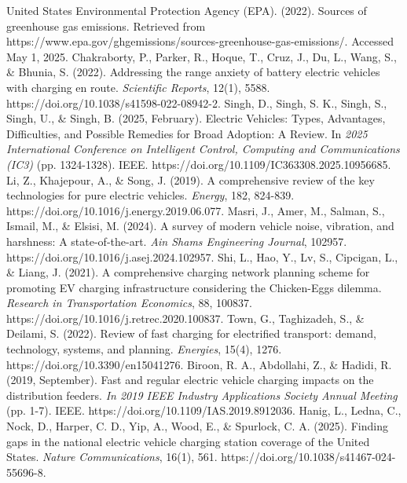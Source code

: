 \documentclass[preprint,12pt]{elsarticle}
\begin{document}
\cleardoublepage

\begin{thebibliography}{00}

United States Environmental Protection Agency (EPA). (2022).
Sources of greenhouse gas emissions.
Retrieved from https://www.epa.gov/ghgemissions/sources-greenhouse-gas-emissions/. Accessed May 1, 2025.
Chakraborty, P., Parker, R., Hoque, T., Cruz, J., Du, L., Wang, S., \& Bhunia, S. (2022). Addressing the range anxiety of battery electric vehicles with charging en route. \textit{Scientific Reports}, 12(1), 5588. https://doi.org/10.1038/s41598-022-08942-2.
Singh, D., Singh, S. K., Singh, S., Singh, U., \& Singh, B. (2025, February). Electric Vehicles: Types, Advantages, Difficulties, and Possible Remedies for Broad Adoption: A Review. In \textit{2025 International Conference on Intelligent Control, Computing and Communications (IC3)} (pp. 1324-1328). IEEE. https://doi.org/10.1109/IC363308.2025.10956685.
Li, Z., Khajepour, A., \& Song, J. (2019). A comprehensive review of the key technologies for pure electric vehicles. \textit{Energy}, 182, 824-839. https://doi.org/10.1016/j.energy.2019.06.077. 
Masri, J., Amer, M., Salman, S., Ismail, M., \& Elsisi, M. (2024). A survey of modern vehicle noise, vibration, and harshness: A state-of-the-art. \textit{Ain Shams Engineering Journal}, 102957. https://doi.org/10.1016/j.asej.2024.102957.
Shi, L., Hao, Y., Lv, S., Cipcigan, L., \& Liang, J. (2021). A comprehensive charging network planning scheme for promoting EV charging infrastructure considering the Chicken-Eggs dilemma. \textit{Research in Transportation Economics}, 88, 100837. https://doi.org/10.1016/j.retrec.2020.100837.
Town, G., Taghizadeh, S., \& Deilami, S. (2022). Review of fast charging for electrified transport: demand, technology, systems, and planning. \textit{Energies}, 15(4), 1276. https://doi.org/10.3390/en15041276.
Biroon, R. A., Abdollahi, Z., \& Hadidi, R. (2019, September). Fast and regular electric vehicle charging impacts on the distribution feeders. \textit{In 2019 IEEE Industry Applications Society Annual Meeting} (pp. 1-7). IEEE. https://doi.org/10.1109/IAS.2019.8912036. 
Hanig, L., Ledna, C., Nock, D., Harper, C. D., Yip, A., Wood, E., \& Spurlock, C. A. (2025). Finding gaps in the national electric vehicle charging station coverage of the United States. \textit{Nature Communications}, 16(1), 561. https://doi.org/10.1038/s41467-024-55696-8.

\end{thebibliography}
\end{document}
